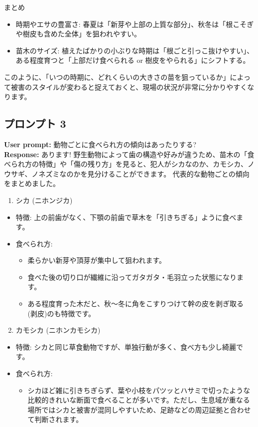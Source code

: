 \documentclass[a4paper, 11pt]{jsarticle}
\begin{document}
まとめ
\begin{itemize}
    \item 時期やエサの豊富さ: 春夏は「新芽や上部の上質な部分」、秋冬は「根こそぎや樹皮も含めた全体」を狙われやすい。
    \item 苗木のサイズ: 植えたばかりの小ぶりな時期は「根ごと引っこ抜けやすい」、ある程度育つと「上部だけ食べられる or 樹皮をやられる」にシフトする。
\end{itemize}
このように、「いつの時期に、どれくらいの大きさの苗を狙っているか」によって被害のスタイルが変わると捉えておくと、現場の状況が非常に分かりやすくなります。

\subsection{プロンプト 3}
\noindent\textbf{User prompt:} 動物ごとに食べられ方の傾向はあったりする? \\
\noindent\textbf{Response:} あります! 野生動物によって歯の構造や好みが違うため、苗木の「食べられ方の特徴」や「傷の残り方」を見ると、犯人がシカなのか、カモシカ、ノウサギ、ノネズミなのかを見分けることができます。
代表的な動物ごとの傾向をまとめました。
\begin{enumerate}
    \item シカ (ニホンジカ)
\end{enumerate}
\begin{itemize}
    \item 特徴: 上の前歯がなく、下顎の前歯で草木を「引きちぎる」ように食べます。
    \item 食べられ方:
    \begin{itemize}
        \item[○] 柔らかい新芽や頂芽が集中して狙われます。
        \item[○] 食べた後の切り口が繊維に沿ってガタガタ・毛羽立った状態になります。
        \item[○] ある程度育った木だと、秋〜冬に角をこすりつけて幹の皮を剥ぎ取る (剥皮)のも特徴です。
    \end{itemize}
\end{itemize}
\begin{enumerate}
    \setcounter{enumi}{1}
    \item カモシカ (ニホンカモシカ)
\end{enumerate}
\begin{itemize}
    \item 特徴: シカと同じ草食動物ですが、単独行動が多く、食べ方も少し綺麗です。
    \item 食べられ方:
    \begin{itemize}
        \item[○] シカほど雑に引きちぎらず、葉や小枝をパツッとハサミで切ったような比較的きれいな断面で食べることが多いです。ただし、生息域が重なる場所ではシカと被害が混同しやすいため、足跡などの周辺証拠と合わせて判断されます。
    \end{itemize}
\end{itemize}
\end{document}
